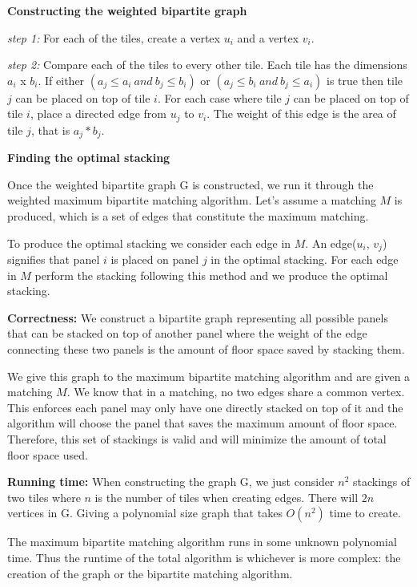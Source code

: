 \documentclass[11pt]{article}
\newcommand\correctness{\vspace{.10in}\textbf{Correctness: }}
\newcommand\runtime{\vspace{.10in}\textbf{Running time: }}
\begin{document}
\textbf{Constructing the weighted bipartite graph}

\textit{step 1:} For each of the tiles, create a vertex $u_i$ and a vertex $v_i$.

\textit{step 2:} Compare each of the tiles to every other tile. Each tile has the dimensions $a_i$ x $b_i$. If either $(a_j \leq a_i \ and \ b_j \leq b_i)$ or $(a_j \leq b_i \ and \ b_j \leq a_i)$ is true then tile $j$ can be placed on top of tile $i$. For each case where tile $j$ can be placed on top of tile $i$, place a directed edge from $u_j$ to $v_i$. The weight of this edge is the area of tile $j$, that is $a_j * b_j$.

\textbf{Finding the optimal stacking}

Once the weighted bipartite graph G is constructed, we run it through the weighted maximum bipartite matching algorithm. Let's assume a matching $M$ is produced, which is a set of edges that constitute the maximum matching.

To produce the optimal stacking we consider each edge in $M$. An edge($u_i$, $v_j$) signifies that panel $i$ is placed on panel $j$ in the optimal stacking. For each edge in $M$ perform the stacking following this method and we produce the optimal stacking.

\correctness We construct a bipartite graph representing all possible panels that can be stacked on top of another panel where the weight of the edge connecting these two panels is the amount of floor space saved by stacking them.

We give this graph to the maximum bipartite matching algorithm and are given a matching $M$. We know that in a matching, no two edges share a common vertex. This enforces each panel may only have one directly stacked on top of it and the algorithm will choose the panel that saves the maximum amount of floor space. Therefore, this set of stackings is valid and will minimize the amount of total floor space used.

\runtime When constructing the graph G, we just consider $n^2$ stackings of two tiles where $n$ is the number of tiles when creating edges. There will $2n$ vertices in G. Giving a polynomial size graph that takes $O(n^2)$ time to create.

	The maximum bipartite matching algorithm runs in some unknown polynomial time. Thus the runtime of the total algorithm is whichever is more complex: the creation of the graph or the bipartite matching algorithm.
\end{document}
